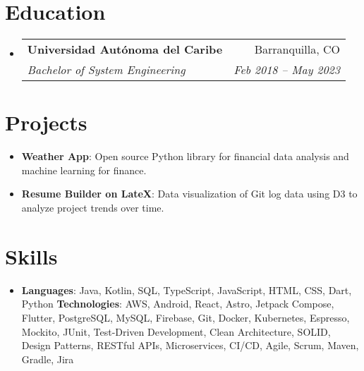 \documentclass[letterpaper,11pt]{article}
\makeatletter
\newcommand{\resumeItem}[2]{
  \item\small{
    \textbf{#1}{: #2 \vspace{-2pt}}
  }
}
\newcommand{\resumeSubheading}[4]{
  \vspace{-1pt}\item
    \begin{tabular*}{0.97\textwidth}[t]{l@{\extracolsep{\fill}}r}
      \textbf{#1} & #2 \\
      \textit{\small#3} & \textit{\small #4} \\
    \end{tabular*}\vspace{-5pt}
}
\newcommand{\resumeSubItem}[2]{\resumeItem{#1}{#2}\vspace{-4pt}}
\newcommand{\resumeSubHeadingListStart}{\begin{itemize}[leftmargin=*]}
\newcommand{\resumeSubHeadingListEnd}{\end{itemize}}
\makeatother
\begin{document}
\section{Education}
\resumeSubHeadingListStart
\resumeSubheading
{Universidad Autónoma del Caribe}{Barranquilla, CO}
{Bachelor of System Engineering}{Feb 2018 -- May 2023}
\resumeSubHeadingListEnd


\section{Projects}
\resumeSubHeadingListStart
\resumeSubItem{Weather App}
{Open source Python library for financial data analysis and machine learning for finance.}
\resumeSubItem{Resume Builder on LateX}
{Data visualization of Git log data using D3 to analyze project trends over time.}
\resumeSubHeadingListEnd


\section{Skills}
\resumeSubHeadingListStart
\item{
            \textbf{Languages}{: Java, Kotlin, SQL, TypeScript, JavaScript, HTML, CSS, Dart, Python}
            \hfill
            \textbf{Technologies}{: AWS, Android, React, Astro, Jetpack Compose, Flutter, PostgreSQL, MySQL, Firebase, Git, Docker, Kubernetes, Espresso, Mockito, JUnit, Test-Driven Development, Clean Architecture, SOLID, Design Patterns, RESTful APIs, Microservices, CI/CD, Agile, Scrum, Maven, Gradle, Jira}
      }
\resumeSubHeadingListEnd


\end{document}
